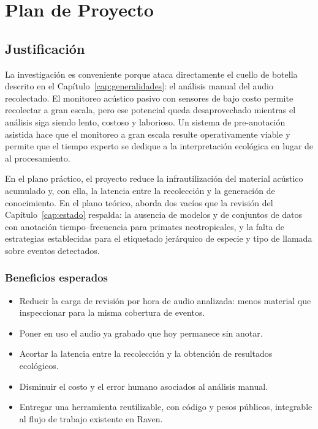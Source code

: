 \chapter{Plan de Proyecto}
\label{anx:plan}

\section{Justificación}

La investigación es conveniente porque ataca directamente el cuello de botella
descrito en el Capítulo~\ref{cap:generalidades}: el análisis manual del audio
recolectado. El monitoreo acústico pasivo con sensores de bajo costo permite
recolectar a gran escala, pero ese potencial queda desaprovechado mientras el
análisis siga siendo lento, costoso y laborioso. Un sistema de pre-anotación
asistida hace que el monitoreo a gran escala resulte operativamente viable y
permite que el tiempo experto se dedique a la interpretación ecológica en lugar
de al procesamiento.

En el plano práctico, el proyecto reduce la infrautilización del material acústico
acumulado y, con ella, la latencia entre la recolección y la generación de
conocimiento. En el plano teórico, aborda dos vacíos que la revisión del
Capítulo~\ref{cap:estado} respalda: la ausencia de
modelos y de conjuntos de datos con anotación tiempo--frecuencia para primates
neotropicales, y la falta de estrategias establecidas para el etiquetado
jerárquico de especie y tipo de llamada sobre eventos detectados.

\subsection{Beneficios esperados}

\begin{itemize}[nosep]
    \item Reducir la carga de revisión por hora de audio analizada: menos
          material que inspeccionar para la misma cobertura de eventos.
    \item Poner en uso el audio ya grabado que hoy permanece sin anotar.
    \item Acortar la latencia entre la recolección y la obtención de resultados
          ecológicos.
    \item Disminuir el costo y el error humano asociados al análisis manual.
    \item Entregar una herramienta reutilizable, con código y pesos públicos,
          integrable al flujo de trabajo existente en Raven.
\end{itemize}

